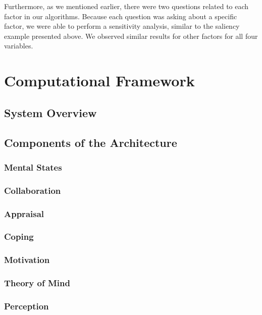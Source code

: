 \documentclass[12pt]{report}
\begin{document}
Furthermore, as we mentioned earlier, there were two questions related to each
factor in our algorithms. Because each question was asking about a specific
factor, we were able to perform a sensitivity analysis, similar to the saliency
example presented above. We observed similar results for other factors for all
four variables.

\chapter{Computational Framework}
\label{ch:framework}

\section{System Overview}

\section{Components of the Architecture}

\subsection{Mental States}

\subsection{Collaboration}

\subsection{Appraisal}

\subsection{Coping}

\subsection{Motivation}

\subsection{Theory of Mind}

\subsection{Perception}
\end{document}
